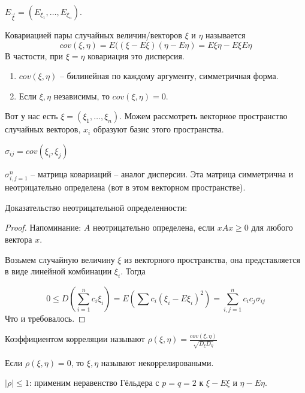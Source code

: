\begin{Def}
    $E_{\vec{\xi}} = (E_{\xi_1}, \dots, E_{\xi_n})$.
\end{Def}
\begin{Def}
    Ковариацией пары случайных величин/векторов $\xi$ и $\eta$ называется $$cov(\xi, \eta) = E((\xi - E\xi)(\eta - E\eta) = E\xi\eta - E\xi E\eta$$ 
    В частости, при $\xi = \eta$ ковариация это дисперсия.
\end{Def}

\begin{theorem}
\begin{enumerate}
    \item $cov(\xi, \eta)$ -- билинейная по каждому аргументу, симметричная форма.
    \item Если $\xi, \eta$ независимы, то $cov(\xi, \eta) = 0$.
\end{enumerate}
\end{theorem}

Вот у нас есть $\xi = (\xi_1, \dots, \xi_n)$. Можем рассмотреть векторное пространство случайных векторов, $x_i$ образуют базис этого пространства.

\begin{Def}
    $\sigma_{ij} = cov(\xi_i, \xi_j)$

    $\sigma_{i,j=1}^n$ -- матрица ковариаций -- аналог дисперсии. Эта матрица симметрична и неотрицательно определена (вот в этом векторном пространстве).
\end{Def}
Доказательство неотрицательной определенности:
\begin{proof}
Напоминание: $A$ неотрицательно определена, если $xAx \geq 0$ для любого вектора $x$. 

Возьмем случайную величину $\xi$ из векторного пространства, она представляется в виде линейной комбинации $\xi_i$. Тогда

$$0 \leq D(\sum\limits_{i = 1}^n c_i \xi_i) = E(\sum c_i (\xi_i - E \xi_i)^2) = \sum\limits_{i,j=1}^n c_i c_j \sigma_{ij}$$
Что и требовалось.
\end{proof}

\begin{Def}
    Коэффициентом корреляции называют $\rho(\xi, \eta) = \frac{cov(\xi, \eta)}{\sqrt{D_\xi D_\eta}}$
    
    Если $\rho(\xi, \eta) = 0$, то $\xi, \eta$ называют некоррелироваными.
\end{Def}
\begin{Rem}
    $|\rho| \leq 1$: применим неравенство Гёльдера с $p=q=2$ к $\xi - E\xi$ и $\eta - E\eta$.
\end{Rem}

